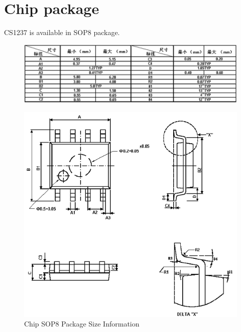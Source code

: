 \documentclass{article}
\begin{document}
\pagebreak

\section{Chip package}

CS1237 is available in SOP8 package.

\begin{figure}[h]
    \centering
    \includegraphics[width=1\textwidth]{fig99.png}
    \label{fig:fig99}
\end{figure}

\begin{figure}[h]
    \centering
    \includegraphics[width=1\textwidth]{fig11.png}
    \caption{Chip SOP8 Package Size Information}
    \label{fig:fig11}
\end{figure}
\end{document}

